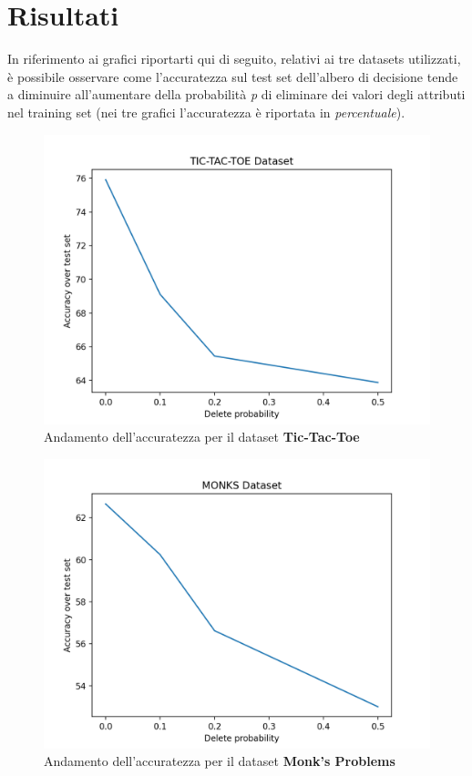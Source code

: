 \documentclass[a4paper, 10pt]{article}
\begin{document}
\section{Risultati}
In riferimento ai grafici riportarti qui di seguito, relativi ai tre datasets utilizzati, è possibile osservare come l'accuratezza sul test set dell'albero di decisione tende a diminuire all'aumentare della probabilità \textit{p} di eliminare dei valori degli attributi nel training set (nei tre grafici l'accuratezza è riportata in \textit{percentuale}).
\newpage
\begin{figure}[h]
\centering
\includegraphics[scale=0.3,angle=0]{tic_tac_toe.png}
\caption{Andamento dell'accuratezza per il dataset \textbf{Tic-Tac-Toe}}
\end{figure}
\begin{figure}[h]
\centering
\includegraphics[scale=0.3,angle=0]{monks.png}
\caption{Andamento dell'accuratezza per il dataset \textbf{Monk's Problems}}
\end{figure}
\end{document}
